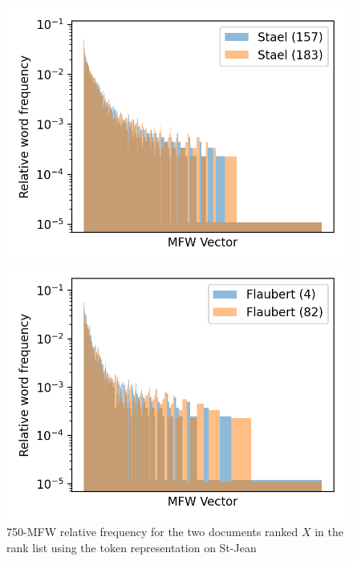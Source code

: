 \begin{figure}
  \centering
  \caption{750-MFW relative frequency for the two documents ranked $X$ in the rank list using the token representation on St-Jean}

  \label{fig:mfw_vector_first_rl}
  \includegraphics[width=\linewidth]{img/mfw_vector_first_rl.png}

  \label{fig:mfw_vector_first_last_rl}
  \includegraphics[width=\linewidth]{img/mfw_vector_first_last_rl.png}


\end{figure}
